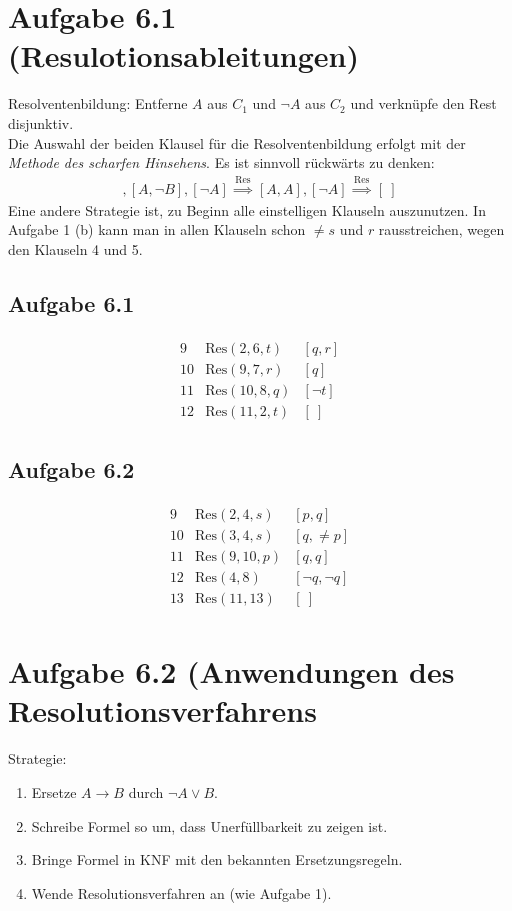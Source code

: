 \documentclass[12pt,a4paper]{article}
\author{Willi Sontopski}
\newcommand{\Res}{\text{Res}}
\newcommand{\Reso}{\stackrel{\Res}{\implies}}
\begin{document}

\section*{Aufgabe 6.1 (Resulotionsableitungen)}
Resolventenbildung: Entferne $A$ aus $C_1$ und $\neg A$ aus $C_2$ und verknüpfe den Rest disjunktiv.\\
Die Auswahl der beiden Klausel für die Resolventenbildung erfolgt mit der \textit{Methode des scharfen Hinsehens}. Es ist sinnvoll rückwärts zu denken:
\begin{align*}
[A,B],[A,\neg B],[\neg A]\Reso[A,A],[\neg A]\Reso[~]
\end{align*}
Eine andere Strategie ist, zu Beginn alle einstelligen Klauseln auszunutzen. In Aufgabe 1 (b) kann man in allen Klauseln schon $\neq s$ und $r$ rausstreichen, wegen den Klauseln 4 und 5.

\subsection*{Aufgabe 6.1}
\begin{align*}
\begin{array}{rll}
9 & \Res(2,6,t) & [q,r]\\
10 & \Res(9, 7,r) & [q]\\
11 & \Res(10,8,q) & [\neg t]\\
12 & \Res(11,2, t) & [~]
\end{array}
\end{align*}

\subsection*{Aufgabe 6.2}
\begin{align*}
\begin{array}{rll}
9 & \Res(2,4,s) & [p,q]\\
10 & \Res(3,4,s) & [q,\neq p]\\
11 & \Res(9,10,p) & [q,q]\\
12 & \Res(4,8) & [\neg q,\neg q]\\
13 & \Res(11,13) & [~]
\end{array}
\end{align*}

\section*{Aufgabe 6.2 (Anwendungen des Resolutionsverfahrens}
Strategie:
\begin{enumerate}
\item Ersetze $A\to B$ durch $\neg A\vee B$.
\item Schreibe Formel so um, dass Unerfüllbarkeit zu zeigen ist.
\item Bringe Formel in KNF mit den bekannten Ersetzungsregeln.
\item Wende Resolutionsverfahren an (wie Aufgabe 1).
\end{enumerate}
\end{document}

